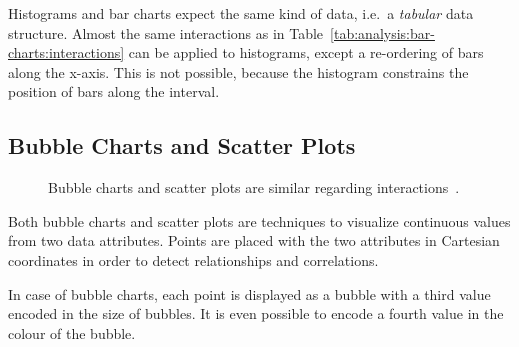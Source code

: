 Histograms and bar charts expect the same kind of data, i.e.\ a \emph{tabular} data structure.
Almost the same interactions as in Table~\ref{tab:analysis:bar-charts:interactions} can be applied to histograms, except a re-ordering of bars along the x-axis.
This is not possible, because the histogram constrains the position of bars along the interval.

\subsection{Bubble Charts and Scatter Plots}

\begin{figure}
  \centering
  \qquad
  \caption{Bubble charts and scatter plots are similar regarding interactions~\parencite{VisualizationCatalogue2017}.}%
  \label{fig:analysis:bubble-chart}
\end{figure}

Both bubble charts and scatter plots are techniques to visualize continuous values from two data attributes.
Points are placed with the two attributes in Cartesian coordinates in order to detect relationships and correlations.

In case of bubble charts, each point is displayed as a bubble with a third value encoded in the size of bubbles.
It is even possible to encode a fourth value in the colour of the bubble.

